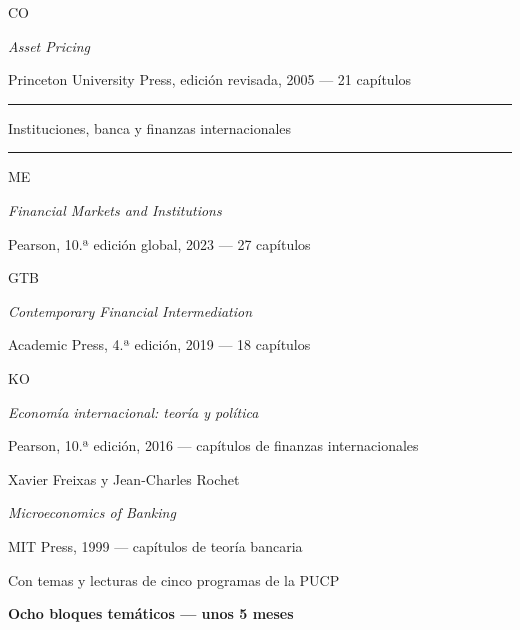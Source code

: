 \documentclass[11pt,a4paper]{article}
\newcommand{\etiqueta}[2]{%
  {\setlength{\fboxsep}{1.4pt}\colorbox{#1}{\sffamily\bfseries\color{white}\strut#2}}}
\begin{document}
\begin{titlepage}
\vspace{0.2cm}
{\large\etiqueta{colorCO}{CO} \par}
{\normalsize \emph{\color{colorCO}Asset Pricing}\par}
{\small\color{mhslate} Princeton University Press, edición revisada, 2005 --- 21 capítulos\par}
\vspace{0.6cm}
{\sffamily\large\bfseries\color{mhblue}\textcolor{mhsky}{\rule[0.5ex]{1.2cm}{0.6pt}}\quad Instituciones, banca y finanzas internacionales\quad\textcolor{mhsky}{\rule[0.5ex]{1.2cm}{0.6pt}}\par}
\vspace{0.3cm}
{\large\etiqueta{colorME}{ME} \par}
{\normalsize \emph{\color{colorME}Financial Markets and Institutions}\par}
{\small\color{mhslate} Pearson, 10.ª edición global, 2023 --- 27 capítulos\par}
\vspace{0.2cm}
{\large\etiqueta{colorGTB}{GTB} \par}
{\normalsize \emph{\color{colorGTB}Contemporary Financial Intermediation}\par}
{\small\color{mhslate} Academic Press, 4.ª edición, 2019 --- 18 capítulos\par}
\vspace{0.2cm}
{\large\etiqueta{colorKO}{KO} \par}
{\normalsize \emph{\color{colorKO}Economía internacional: teoría y política}\par}
{\small\color{mhslate} Pearson, 10.ª edición, 2016 --- capítulos de finanzas internacionales\par}
\vspace{0.2cm}
{\large\color{mhnavy} Xavier Freixas y Jean-Charles Rochet\par}
{\normalsize \emph{\color{mhsteel}Microeconomics of Banking}\par}
{\small\color{mhslate} MIT Press, 1999 --- capítulos de teoría bancaria\par}
\vspace{0.5cm}
{\normalsize\color{colorPUCP} Con temas y lecturas de cinco programas de la PUCP\par}
\vfill
{\setlength{\fboxsep}{6pt}\colorbox{mhblue}{\normalsize\sffamily\bfseries\color{white} Ocho bloques temáticos --- unos 5 meses}\par}
\vspace{0.2cm}
\end{titlepage}
\end{document}
